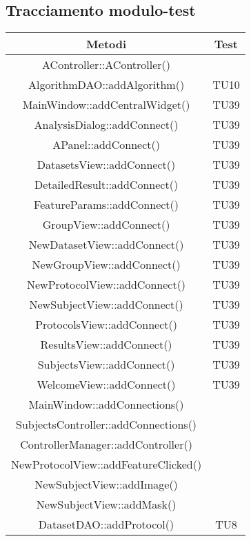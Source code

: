 

\subsection{Tracciamento modulo-test}
\label{tracciamentomodulotest}
	
\begin{center}
\begin{longtable}{|c|c|}
\hline

\textbf{Metodi} & \textbf{Test} \\

\hline 
AController::AController() &  \\
\hline 
AlgorithmDAO::addAlgorithm() & TU10 \\
\hline 
MainWindow::addCentralWidget() & TU39 \\
\hline 
AnalysisDialog::addConnect() & TU39 \\
\hline 
APanel::addConnect() & TU39 \\
\hline 
DatasetsView::addConnect() & TU39 \\
\hline 
DetailedResult::addConnect() & TU39 \\
\hline 
FeatureParams::addConnect() & TU39 \\
\hline 
GroupView::addConnect() & TU39 \\
\hline 
NewDatasetView::addConnect() & TU39 \\
\hline 
NewGroupView::addConnect() & TU39 \\
\hline 
NewProtocolView::addConnect() & TU39 \\
\hline 
NewSubjectView::addConnect() & TU39 \\
\hline 
ProtocolsView::addConnect() & TU39 \\
\hline 
ResultsView::addConnect() & TU39 \\
\hline 
SubjectsView::addConnect() & TU39 \\
\hline 
WelcomeView::addConnect() & TU39 \\
\hline 
MainWindow::addConnections() &  \\
\hline 
SubjectsController::addConnections() &  \\
\hline 
ControllerManager::addController() &  \\
\hline 
NewProtocolView::addFeatureClicked() &  \\
\hline 
NewSubjectView::addImage() &  \\
\hline 
NewSubjectView::addMask() &  \\
\hline 
DatasetDAO::addProtocol() & TU8 \\

\end{longtable}
\end{center}

